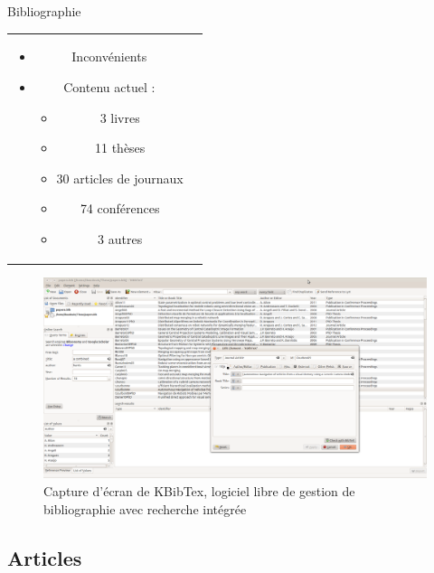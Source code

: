 \documentclass{beamer}
\begin{document}
\begin{frame}{Bibliographie}
\begin{tabular}{c c}
\begin{minipage}{0.6\linewidth}
\begin{itemize}
  \item Inconvénients
    \vspace{5mm}
  \item Contenu actuel : %
    \begin{itemize}
    \item 3 livres
    \item 11 thèses
    \item 30 articles de journaux
    \item 74 conférences
    \item 3 autres
    \end{itemize}
  \end{itemize}
\end{minipage}
\end{tabular}
\end{frame}

\begin{frame}
  \begin{figure}
    \includegraphics[width=1.0\linewidth]{images/KBibTex.png}
    \caption{Capture d'écran de KBibTex, logiciel libre de gestion de bibliographie avec recherche intégrée}
  \end{figure}
\end{frame}

\subsection*{Articles}
\end{document}
